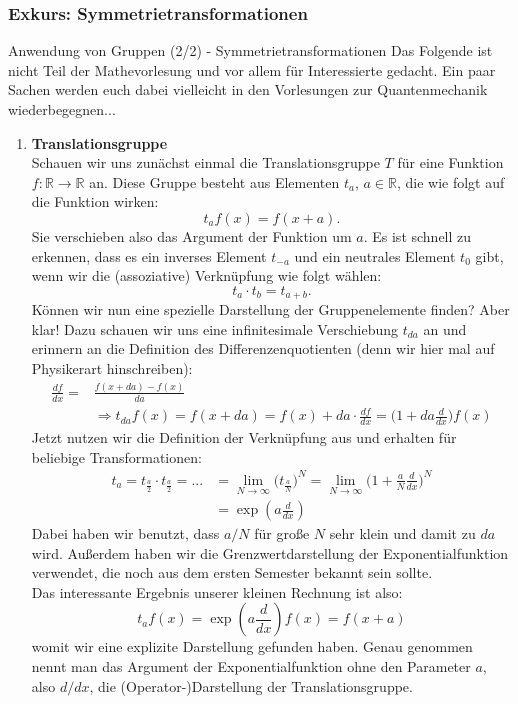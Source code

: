 \subsubsection{Exkurs: Symmetrietransformationen}
\begin{Beispiel}
{Anwendung von Gruppen (2/2) - Symmetrietransformationen}
Das Folgende ist nicht Teil der Mathevorlesung und vor allem für Interessierte gedacht. Ein paar Sachen werden euch dabei vielleicht in den Vorlesungen zur Quantenmechanik wiederbegegnen... \\
\begin{enumerate}
\item \textbf{Translationsgruppe} \\
Schauen wir uns zunächst einmal die Translationsgruppe $T$ für eine Funktion \linebreak $f:\mathbb{R} \rightarrow \mathbb{R}$ an. Diese Gruppe besteht aus Elementen $t_{a}$, $a \in \mathbb{R}$, die wie folgt auf die Funktion wirken:
\begin{equation*}
    t_{a}f(x)=f(x+a).    
\end{equation*}
Sie verschieben also das Argument der Funktion um $a$. Es ist schnell zu erkennen, dass es ein inverses Element $t_{-a}$ und ein neutrales Element $t_{0}$ gibt, wenn wir die (assoziative) Verknüpfung wie folgt wählen:
\begin{equation*}
    t_{a}\cdot t_{b} = t_{a+b}.
\end{equation*}
Können wir nun eine spezielle Darstellung der Gruppenelemente finden? Aber klar! Dazu schauen wir uns eine infinitesimale Verschiebung $t_{da}$ an und erinnern an die Definition des Differenzenquotienten (denn wir hier mal auf Physikerart hinschreiben):
\begin{align*}
    \frac{df}{dx}=&\frac{f(x+da)-f(x)}{da} \\
    &\Rightarrow t_{da}f(x) = f(x+da) = f(x)+da \cdot \frac{df}{dx} = \big( 1 + da\frac{d}{dx} \big) f(x)
\end{align*}
Jetzt nutzen wir die Definition der Verknüpfung aus und erhalten für beliebige Transformationen:
\begin{align*}
    t_{a} = t_{\frac{a}{2}}\cdot t_{\frac{a}{2}} = ... &= \lim_{N \rightarrow \infty} \big( t_{\frac{a}{N}} \big)^{N} = \lim_{N \rightarrow \infty} \big( 1 + \frac{a}{N} \frac{d}{dx} \big)^{N} \\ 
    &= \exp{(a\frac{d}{dx})}
\end{align*}
Dabei haben wir benutzt, dass $a/N$ für große $N$ sehr klein und damit zu $da$ wird. Außerdem haben wir die Grenzwertdarstellung der Exponentialfunktion verwendet, die noch aus dem ersten Semester bekannt sein sollte. \\
Das interessante Ergebnis unserer kleinen Rechnung ist also:
\begin{equation*}
    t_{a}f(x)=\exp{(a\frac{d}{dx})}f(x) = f(x+a)
\end{equation*}
womit wir eine explizite Darstellung gefunden haben. Genau genommen nennt man das Argument der Exponentialfunktion ohne den Parameter $a$, also $d/dx$, die (Operator-)Darstellung der Translationsgruppe.


\end{enumerate}
\end{Beispiel}
